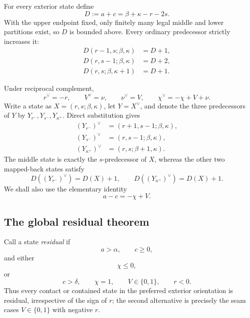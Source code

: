 \documentclass[11pt]{article}
\theoremstyle{definition}
\begin{document}
For every exterior state define
\begin{equation*}
D:=a+c=\beta+\kappa-r-2s.
\end{equation*}
With the upper endpoint fixed, only finitely many legal middle and lower partitions exist, so \(D\) is bounded above.  Every ordinary predecessor strictly increases it:
\begin{equation}\label{eq:D-predecessors}
\begin{aligned}
D(r-1,s;\beta,\kappa)&=D+1,\\
D(r,s-1;\beta,\kappa)&=D+2,\\
D(r,s;\beta,\kappa+1)&=D+1.
\end{aligned}
\end{equation}

Under reciprocal complement,
\begin{equation}\label{eq:residual-reciprocal-dictionary}
r^\vee=-r,
\qquad
V^\vee=\nu,
\qquad
\nu^\vee=V,
\qquad
\chi^\vee=-\chi+V+\nu.
\end{equation}
Write a state as \(X=(r,s;\beta,\kappa)\), let \(Y=X^\vee\), and denote the three predecessors of \(Y\) by \(Y_{r^-},Y_{s^-},Y_{\kappa^+}\).  Direct substitution gives
\begin{equation}\label{eq:reciprocal-predecessors}
\begin{aligned}
(Y_{r^-})^\vee&=(r+1,s-1;\beta,\kappa),\\
(Y_{s^-})^\vee&=(r,s-1;\beta,\kappa),\\
(Y_{\kappa^+})^\vee&=(r,s;\beta+1,\kappa).
\end{aligned}
\end{equation}
The middle state is exactly the \(s\)-predecessor of \(X\), whereas the other two mapped-back states satisfy
\begin{equation}\label{eq:D-reciprocal-predecessors}
D((Y_{r^-})^\vee)=D(X)+1,
\qquad
D((Y_{\kappa^+})^\vee)=D(X)+1.
\end{equation}
We shall also use the elementary identity
\begin{equation}\label{eq:a-c-support}
a-c=-\chi+V.
\end{equation}

\subsection{The global residual theorem}

Call a state \emph{residual} if
\begin{equation}\label{eq:residual-class-simplified}
a>\alpha,
\qquad c\ge0,
\end{equation}
and either
\begin{equation*}
\chi\le0,
\end{equation*}
or
\begin{equation*}
c>\delta,
\qquad \chi=1,
\qquad V\in\{0,1\},
\qquad r<0.
\end{equation*}
Thus every contact or contained state in the preferred exterior orientation is residual, irrespective of the sign of \(r\); the second alternative is precisely the seam cases \(V\in\{0,1\}\) with negative \(r\).
\end{document}
